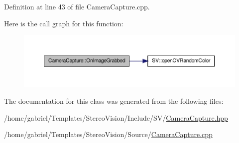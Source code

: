 Definition at line 43 of file Camera\-Capture.\-cpp.



Here is the call graph for this function\-:
\nopagebreak
\begin{figure}[H]
\begin{center}
\leavevmode
\includegraphics[width=350pt]{class_camera_capture_a51f4f8a10ee4efbb2a15d5141ed7030c_cgraph}
\end{center}
\end{figure}




The documentation for this class was generated from the following files\-:\begin{DoxyCompactItemize}
\item 
/home/gabriel/\-Templates/\-Stereo\-Vision/\-Include/\-S\-V/\hyperlink{_camera_capture_8hpp}{Camera\-Capture.\-hpp}\item 
/home/gabriel/\-Templates/\-Stereo\-Vision/\-Source/\hyperlink{_camera_capture_8cpp}{Camera\-Capture.\-cpp}\end{DoxyCompactItemize}
